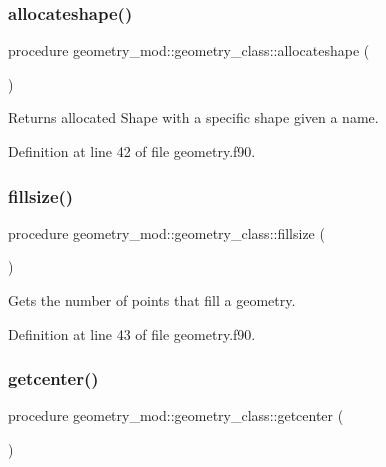 \subsubsection{\texorpdfstring{allocateshape()}{allocateshape()}}
{\footnotesize\ttfamily procedure geometry\+\_\+mod\+::geometry\+\_\+class\+::allocateshape (\begin{DoxyParamCaption}{ }\end{DoxyParamCaption})\hspace{0.3cm}{\ttfamily [private]}}



Returns allocated Shape with a specific shape given a name. 



Definition at line 42 of file geometry.\+f90.

\mbox{\label{structgeometry__mod_1_1geometry__class_a75f5a37d0b38c8baf66ee5089ea44d7a}} 
\subsubsection{\texorpdfstring{fillsize()}{fillsize()}}
{\footnotesize\ttfamily procedure geometry\+\_\+mod\+::geometry\+\_\+class\+::fillsize (\begin{DoxyParamCaption}{ }\end{DoxyParamCaption})\hspace{0.3cm}{\ttfamily [private]}}



Gets the number of points that fill a geometry. 



Definition at line 43 of file geometry.\+f90.

\mbox{\label{structgeometry__mod_1_1geometry__class_a691891378a677185f2f13e736f68ff11}} 
\subsubsection{\texorpdfstring{getcenter()}{getcenter()}}
{\footnotesize\ttfamily procedure geometry\+\_\+mod\+::geometry\+\_\+class\+::getcenter (\begin{DoxyParamCaption}{ }\end{DoxyParamCaption})\hspace{0.3cm}{\ttfamily [private]}}



